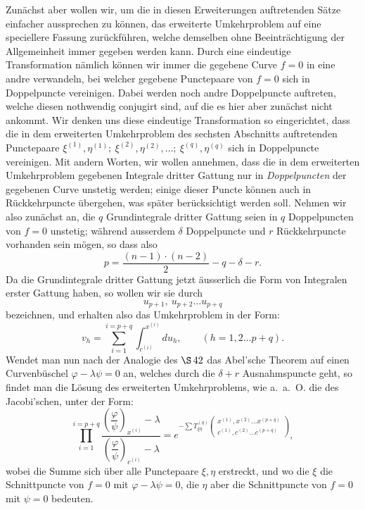 \documentclass[10pt]{article}
\begin{document}
Zunächst aber wollen wir, um die in diesen Erweiterungen auftretenden Sätze einfacher aussprechen zu können, das erweiterte Umkehrproblem auf eine speciellere Fassung zurückführen, welche demselben ohne Beeinträchtigung der Allgemeinheit immer gegeben werden kann. Durch eine eindeutige Transformation nämlich können wir immer die gegebene Curve \(f=0\) in eine andre verwandeln, bei welcher gegebene Punctepaare von \(f=0\) sich in Doppelpuncte vereinigen. Dabei werden noch andre Doppelpuncte auftreten, welche diesen nothwendig conjugirt sind, auf die es hier aber zunächst nicht ankommt. Wir denken uns diese eindeutige Transformation so eingerichtet, dass die in dem erweiterten Umkehrproblem des sechsten Abschnitts auftretenden Punctepaare \(\xi^{(1)},\eta^{(1)};\ \xi^{(2)},\eta^{(2)},\ldots;\ \xi^{(q)},\eta^{(q)}\) sich in Doppelpuncte vereinigen. Mit andern Worten, wir wollen annehmen, dass die in dem erweiterten Umkehrproblem gegebenen Integrale dritter Gattung nur in \emph{Doppelpuncten} der gegebenen Curve unstetig werden; einige dieser Puncte können auch in Rückkehrpuncte übergehen, was später berücksichtigt werden soll. Nehmen wir also zunächst an, die \(q\) Grundintegrale dritter Gattung seien in \(q\) Doppelpuncten von \(f=0\) unstetig; während ausserdem \(\delta\) Doppelpuncte und \(r\) Rückkehrpuncte vorhanden sein mögen, so dass also
\[
p=\frac{(n-1)\cdot(n-2)}{2}-q-\delta-r.
\]
Da die Grundintegrale dritter Gattung jetzt äusserlich die Form von Integralen erster Gattung haben, so wollen wir sie durch
\[
u_{p+1},\ u_{p+2}\ldots u_{p+q}
\]
bezeichnen, und erhalten also das Umkehrproblem in der Form:
\[
v_h=\sum_{i=1}^{i=p+q}\int_{c^{(i)}}^{x^{(i)}}du_h,
\qquad (h=1,2\ldots p+q).
\]
Wendet man nun nach der Analogie des \(\S\,42\) das Abel'sche Theorem auf einen Curvenbüschel \(\varphi-\lambda\psi=0\) an, welches durch die \(\delta+r\) Ausnahmspuncte geht, so findet man die Lösung des erweiterten Umkehrproblems, wie a.\ a.\ O. die des Jacobi'schen, unter der Form:
\[
\prod_{i=1}^{i=p+q}
\frac{\left(\dfrac{\varphi}{\psi}\right)_{x^{(i)}}-\lambda}
     {\left(\dfrac{\varphi}{\psi}\right)_{c^{(i)}}-\lambda}
=
e^{-\sum T_{\xi\eta}^{(q)}
\begin{pmatrix}
x^{(1)},x^{(2)}\ldots x^{(p+q)}\\
c^{(1)},c^{(2)}\ldots c^{(p+q)}
\end{pmatrix}},
\]
wobei die Summe sich über alle Punctepaare \(\xi,\eta\) erstreckt, und wo die \(\xi\) die Schnittpuncte von \(f=0\) mit \(\varphi-\lambda\psi=0\), die \(\eta\) aber die Schnittpuncte von \(f=0\) mit \(\psi=0\) bedeuten.
\end{document}
